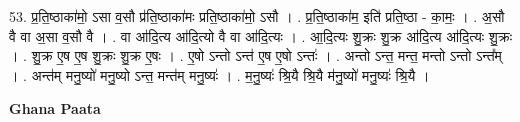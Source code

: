 \documentclass[17pt]{extarticle}
\begin{document}
53. प्र॒ति॒ष्ठाका॑मो॒ ऽसा व॒सौ प्र॑ति॒ष्ठाका॑मः प्रति॒ष्ठाका॑मो॒ ऽसौ । . प्र॒ति॒ष्ठाका॑म॒ इति॑ प्रति॒ष्ठा - का॒मः॒ । . अ॒सौ वै वा अ॒सा व॒सौ वै । . वा आ॑दि॒त्य आ॑दि॒त्यो वै वा आ॑दि॒त्यः । . आ॒दि॒त्यः शु॒क्रः शु॒क्र आ॑दि॒त्य आ॑दि॒त्यः शु॒क्रः । . शु॒क्र ए॒ष ए॒ष शु॒क्रः शु॒क्र ए॒षः । . ए॒षो ऽन्तो ऽन्त॑ ए॒ष ए॒षो ऽन्तः॑ । . अन्तो ऽन्त॒ मन्त॒ मन्तो ऽन्तो ऽन्त᳚म् । . अन्त॑म् मनु॒ष्यो॑ मनु॒ष्यो ऽन्त॒ मन्त॑म् मनु॒ष्यः॑ । . म॒नु॒ष्यः॑ श्रि॒यै श्रि॒यै म॑नु॒ष्यो॑ मनु॒ष्यः॑ श्रि॒यै । \newline

\textbf{Ghana Paata } \newline
\end{document}

